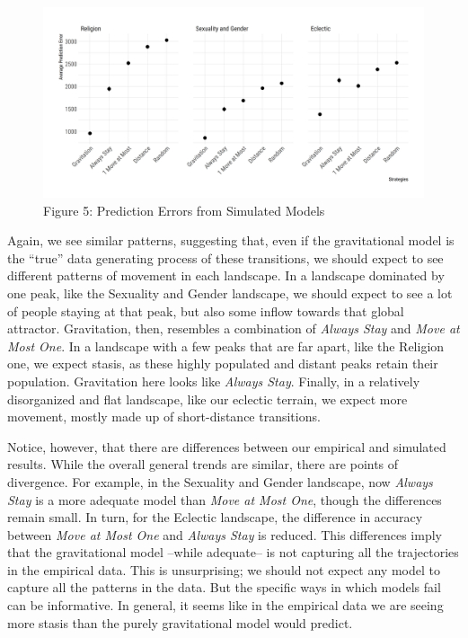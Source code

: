 \documentclass[
  11pt,
]{article}
\begin{document}
\begin{figure}[htp]
\begin{center}
\caption*{Figure 5: Prediction Errors from Simulated Models}

\begin{center}\includegraphics[width=1\linewidth]{../figures/figure_5} \end{center}

\end{center}
\end{figure}

Again, we see similar patterns, suggesting that, even if the
gravitational model is the ``true'' data generating process of these
transitions, we should expect to see different patterns of movement in
each landscape. In a landscape dominated by one peak, like the Sexuality
and Gender landscape, we should expect to see a lot of people staying at
that peak, but also some inflow towards that global attractor.
Gravitation, then, resembles a combination of \emph{Always Stay} and
\emph{Move at Most One}. In a landscape with a few peaks that are far
apart, like the Religion one, we expect stasis, as these highly
populated and distant peaks retain their population. Gravitation here
looks like \emph{Always Stay}. Finally, in a relatively disorganized and
flat landscape, like our eclectic terrain, we expect more movement,
mostly made up of short-distance transitions.

Notice, however, that there are differences between our empirical and
simulated results. While the overall general trends are similar, there
are points of divergence. For example, in the Sexuality and Gender
landscape, now \emph{Always Stay} is a more adequate model than
\emph{Move at Most One}, though the differences remain small. In turn,
for the Eclectic landscape, the difference in accuracy between
\emph{Move at Most One} and \emph{Always Stay} is reduced. This
differences imply that the gravitational model --while adequate-- is not
capturing all the trajectories in the empirical data. This is
unsurprising; we should not expect any model to capture all the patterns
in the data. But the specific ways in which models fail can be
informative. In general, it seems like in the empirical data we are
seeing more stasis than the purely gravitational model would predict.
\end{document}
